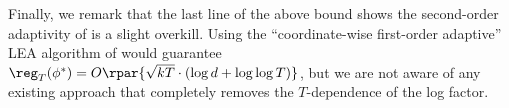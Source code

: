 \documentclass[10pt]{article}
\begin{document}
Finally, we remark that the last line of the above bound shows the second-order adaptivity of \cite{chen2021impossible} is a slight overkill. Using the ``coordinate-wise first-order adaptive'' LEA algorithm of \cite{luo2015achieving} would guarantee $\reg_T(\phi^*)=O\rpar{\sqrt{kT}\cdot(\log d + \log\log T)}$, but we are not aware of any existing approach that completely removes the $T$-dependence of the log factor. 
\end{document}
